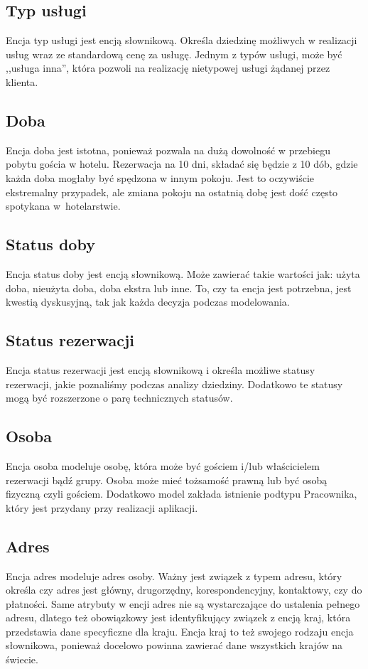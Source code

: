 \documentclass[a4paper,onecolumn,oneside,11pt,wide,floatssmall]{mwrep}
\theoremstyle{definition}
\theoremstyle{plain}%
\theoremstyle{remark}
\begin{document}
\subsection{Typ usługi}
Encja typ usługi jest encją słownikową. Określa dziedzinę możliwych w realizacji usług wraz ze standardową cenę za usługę. Jednym z typów usługi, może być ,,usługa inna'', która pozwoli na realizację nietypowej usługi żądanej przez klienta.

\subsection{Doba}
Encja doba jest istotna, ponieważ pozwala na dużą dowolność w przebiegu pobytu gościa w hotelu. Rezerwacja na 10 dni, składać się będzie z 10 dób, gdzie każda doba mogłaby być spędzona w innym pokoju. Jest to oczywiście ekstremalny przypadek, ale zmiana pokoju na ostatnią dobę jest dość często spotykana \mbox{w hotelarstwie}.

\subsection{Status doby}
Encja status doby jest encją słownikową. Może zawierać takie wartości jak: użyta doba, nieużyta doba, doba ekstra lub inne. To, czy ta encja jest potrzebna, jest kwestią dyskusyjną, tak jak każda decyzja podczas modelowania.

\subsection{Status rezerwacji}
Encja status rezerwacji jest encją słownikową i określa możliwe statusy rezerwacji, jakie poznaliśmy podczas analizy dziedziny. Dodatkowo te statusy mogą być rozszerzone o parę technicznych statusów.

\subsection{Osoba}
Encja osoba modeluje osobę, która może być gościem i/lub właścicielem rezerwacji bądź grupy. Osoba może mieć tożsamość prawną lub być osobą fizyczną czyli gościem. Dodatkowo model zakłada istnienie podtypu Pracownika, który jest przydany przy realizacji aplikacji. 

\subsection{Adres}
Encja adres modeluje adres osoby. Ważny jest związek z typem adresu, który określa czy adres jest główny, drugorzędny, korespondencyjny, kontaktowy, czy do płatności. Same atrybuty w encji adres nie są wystarczające do ustalenia pełnego adresu, dlatego też obowiązkowy jest identyfikujący związek z encją kraj, która przedstawia dane specyficzne dla kraju. Encja kraj to też swojego rodzaju encja słownikowa, ponieważ docelowo powinna zawierać dane wszystkich krajów na świecie.
\end{document}
